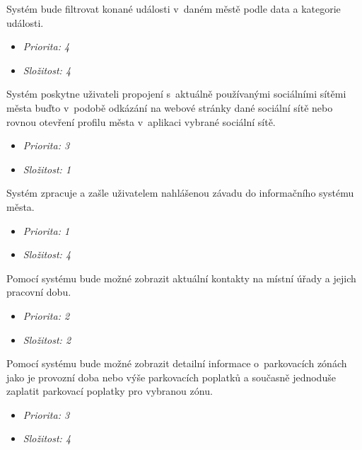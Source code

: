 
Systém bude filtrovat konané události v~daném městě podle data a kategorie události.

\begin{itemize}
  \item \textit{Priorita: 4}
  \item \textit{Složitost: 4}
\end{itemize}

Systém poskytne uživateli propojení s~aktuálně používanými sociálními sítěmi města buďto v~podobě odkázání na webové stránky 
dané sociální sítě nebo rovnou otevření profilu města v~aplikaci vybrané sociální sítě.  

\begin{itemize}
  \item \textit{Priorita: 3}
  \item \textit{Složitost: 1}
\end{itemize}

Systém zpracuje a zašle uživatelem nahlášenou závadu do informačního systému města.

\begin{itemize}
  \item \textit{Priorita: 1}
  \item \textit{Složitost: 4}
\end{itemize}

Pomocí systému bude možné zobrazit aktuální kontakty na místní úřady a jejich pracovní dobu.

\begin{itemize}
  \item \textit{Priorita: 2}
  \item \textit{Složitost: 2}
\end{itemize}

Pomocí systému bude možné zobrazit detailní informace o~parkovacích zónách jako je provozní doba nebo výše parkovacích poplatků a současně jednoduše zaplatit parkovací poplatky pro vybranou zónu.
\begin{itemize}
  \item \textit{Priorita: 3}
  \item \textit{Složitost: 4}
\end{itemize}

